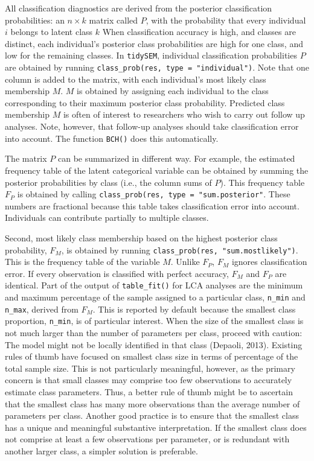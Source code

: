 \documentclass[
  ,man,floatsintext]{apa6}
\begin{document}
All classification diagnostics are derived from the posterior classification probabilities: an \(n \times k\) matrix called \(P\), with the probability that every individual \(i\) belongs to latent class \(k\)
When classification accuracy is high, and classes are distinct,
each individual's posterior class probabilities are high for one class, and low for the remaining classes.
In \texttt{tidySEM}, individual classification probabilities \(P\) are obtained by running \texttt{class\_prob(res,\ type\ =\ "individual")}.
Note that one column is added to the matrix, with each individual's most likely class membership \(M\).
\(M\) is obtained by assigning each individual to the class corresponding to their maximum posterior class probability.
Predicted class membership \(M\) is often of interest to researchers who wish to carry out follow up analyses.
Note, however, that follow-up analyses should take classification error into account.
The function \texttt{BCH()} does this automatically.

The matrix \(P\) can be summarized in different way.
For example, the estimated frequency table of the latent categorical variable can be obtained by summing the posterior probabilities by class (i.e., the column sums of \(P\)).
This frequency table \(F_P\) is obtained by calling \texttt{class\_prob(res,\ type\ =\ "sum.posterior"}.
These numbers are fractional because this table takes classification error into account.
Individuals can contribute partially to multiple classes.

Second, most likely class membership based on the highest posterior class probability, \(F_M\), is obtained by running \texttt{class\_prob(res,\ "sum.mostlikely")}.
This is the frequency table of the variable \(M\).
Unlike \(F_P\), \(F_M\) ignores classification error.
If every observation is classified with perfect accuracy,
\(F_M\) and \(F_P\) are identical.
Part of the output of \texttt{table\_fit()} for LCA analyses
are the minimum and maximum percentage of the sample assigned to a particular class, \texttt{n\_min} and \texttt{n\_max}, derived from \(F_M\).
This is reported by default because the smallest class proportion, \texttt{n\_min}, is of particular interest.
When the size of the smallest class is not much larger than the number of parameters per class,
proceed with caution:
The model might not be locally identified in that class (Depaoli, 2013).
Existing rules of thumb have focused on smallest class size in terms of percentage of the total sample size.
This is not particularly meaningful,
however, as the primary concern is that small classes may comprise too few observations to accurately estimate class parameters.
Thus, a better rule of thumb might be to ascertain that the smallest class has many more observations than the average number of parameters per class.
Another good practice is to ensure that the smallest class has a unique and meaningful substantive interpretation.
If the smallest class does not comprise at least a few observations per parameter, or is redundant with another larger class, a simpler solution is preferable.
\end{document}
